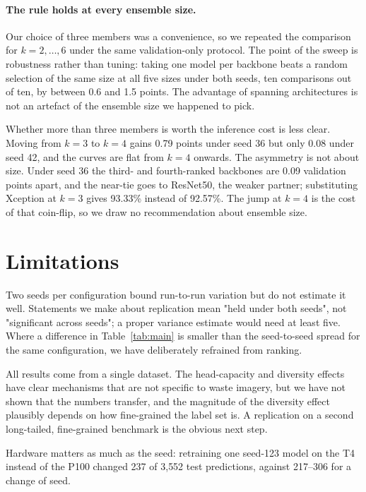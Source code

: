 \documentclass[runningheads]{llncs}
\begin{document}
\paragraph{The rule holds at every ensemble size.}
Our choice of three members was a convenience, so we repeated the comparison
for $k = 2,\dots,6$ under the same validation-only protocol.
The point of the sweep is robustness rather than tuning: taking one model per
backbone beats a random selection of the same size at all five sizes under both
seeds, ten comparisons out of ten, by between 0.6 and 1.5 points. The advantage
of spanning architectures is not an artefact of the ensemble size we happened
to pick.

Whether more than three members is worth the inference cost is less clear.
Moving from $k=3$ to $k=4$ gains 0.79 points under seed 36 but only 0.08 under
seed 42, and the curves are flat from $k=4$ onwards. The asymmetry is not about
size. Under seed 36 the third- and fourth-ranked backbones are 0.09 validation
points apart, and the near-tie goes to ResNet50, the weaker partner;
substituting Xception at $k=3$ gives 93.33\% instead of 92.57\%. The jump at
$k=4$ is the cost of that coin-flip, so we draw no recommendation about
ensemble size.

\section{Limitations}
\label{sec:limits}

Two seeds per configuration bound run-to-run variation but do not estimate it
well. Statements we make about replication mean "held under both seeds", not
"significant across seeds"; a proper variance estimate would need at least five.
Where a difference in Table~\ref{tab:main} is smaller than the seed-to-seed
spread for the same configuration, we have deliberately refrained from ranking.

All results come from a single dataset. The head-capacity and diversity effects
have clear mechanisms that are not specific to waste imagery, but we have not
shown that the numbers transfer, and the magnitude of the diversity effect
plausibly depends on how fine-grained the label set is. A replication on a
second long-tailed, fine-grained benchmark is the obvious next step.

Hardware matters as much as the seed: retraining one seed-123 model on the T4
instead of the P100 changed 237 of 3{,}552 test predictions, against 217--306
for a change of seed.
\end{document}
